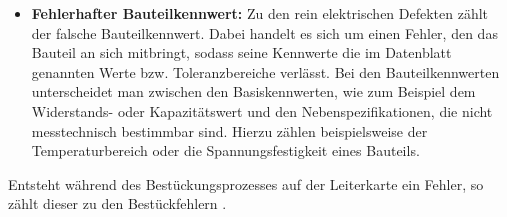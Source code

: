 \begin{itemize}
            \item \textbf{Fehlerhafter Bauteilkennwert:} Zu den rein elektrischen Defekten zählt der falsche Bauteilkennwert. Dabei handelt es sich um einen Fehler, den das Bauteil an sich mitbringt, sodass seine Kennwerte die im Datenblatt genannten Werte bzw. Toleranzbereiche verlässt. \cite{berger_test-_2012} Bei den Bauteilkennwerten unterscheidet man zwischen den Basiskennwerten, wie zum Beispiel dem Widerstands- oder Kapazitätswert und den Nebenspezifikationen, die nicht messtechnisch bestimmbar sind. Hierzu zählen beispielsweise der Temperaturbereich oder die Spannungsfestigkeit eines Bauteils. \cite{neumann_mut_2014}
        \end{itemize}

        Entsteht während des Bestückungsprozesses auf der Leiterkarte ein Fehler, so zählt dieser zu den Bestückfehlern \cite{berger_test-_2012}.


